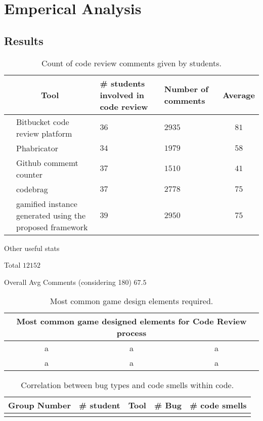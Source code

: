 \documentclass[conference]{IEEEtran}
\newcounter{magicrownumbers}
\newcommand\rownumber{\stepcounter{magicrownumbers}\arabic{magicrownumbers}}
\begin{document}

\section{Emperical Analysis}

\subsection{Results}

\begin{table}[ht]
\centering
\caption{Count of code review comments given by students.}
\begin{tabular}{|c|p{2.5cm}|p{1.5cm}|p{1.5cm}|c|} \hline
\multicolumn{2}{|c|}{Tool} & \# students involved in code review & Number of comments & Average  \\ \hline \hline
 \setcounter{magicrownumbers}{0}\rownumber & Bitbucket code review platform & $36$ & $2935$ & $81$ \\ 
 \rownumber & Phabricator & $34$ &  $1979$  & $58$ \\
 \rownumber & Github commemt counter & $37$ & $1510$ & $41$ \\
 \rownumber & codebrag & $37$ & $2778$ & $75$ \\
 \rownumber & gamified instance generated using the proposed framework & $39$ & $2950$ & $75$ \\
 \hline
\end{tabular}
\label{tab:commentscount}
\end{table}

Other useful stats

Total
$12152$

Overall Avg Comments (considering 180)
$67.5$

\begin{table}[h]
\centering
\caption{Most common game design elements required.}
\begin{tabular}{|ccc|} \hline
 \multicolumn{3}{|c|}{Most common game designed elements for Code Review process}  \\ \hline
 a & a & a \\
 a & a & a \\
 \hline
\end{tabular}
\label{tab:gamede}
\end{table}

\begin{table}[h]
\centering
\caption{Correlation between bug types and code smells within code.}
\begin{tabular}{|c|c|c|c|c|} \hline
 Group Number & \# student & Tool & \# Bug & \# code smells \\ \hline
 & & & &\\
 \hline
\end{tabular}
\label{tab:bugsandsmells}
\end{table}
\end{document}
